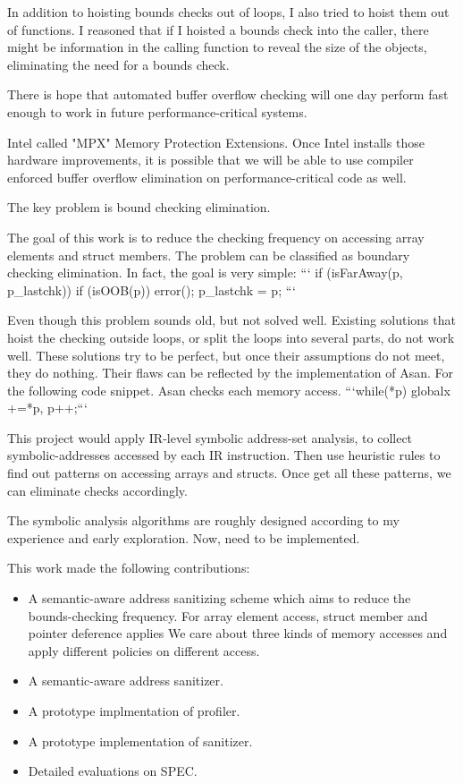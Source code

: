 



In addition to hoisting bounds checks out of loops, I also tried to hoist them out of functions. I reasoned that if I hoisted a bounds check into the caller, there might be information in the calling function to reveal the size of the objects, eliminating the need for a bounds check.


There is hope that automated buffer overflow checking will one day perform fast enough to work in future performance-critical systems.


Intel called "MPX" Memory Protection Extensions. Once Intel installs those hardware improvements, it is possible that we will be able to use compiler enforced buffer overflow elimination on performance-critical code as well.

The key problem is bound checking elimination.


The goal of this work is to reduce the checking frequency on accessing array elements and struct members.
The problem can be classified as boundary checking elimination. In fact, the goal is very simple:
```
if (isFarAway(p, p_lastchk)) {
    if (isOOB(p)) error();
    p_lastchk = p;
  }
```

Even though this problem sounds old, but not solved well.
Existing solutions that hoist the checking outside loops, or split the loops into several parts, do not work well.
These solutions try to be perfect, but once their assumptions do not meet, they do nothing.
Their flaws can be reflected by the implementation of Asan.
For the following code snippet. Asan checks each memory access.
```while(*p) {globalx +=*p, p++;}```

This project would apply IR-level symbolic address-set analysis, to collect symbolic-addresses accessed by each IR instruction.
Then use heuristic rules to find out patterns on accessing arrays and structs.
Once get all these patterns, we can eliminate checks accordingly.

The symbolic analysis algorithms are roughly designed according to my experience and early exploration.
Now, need to be implemented.


This work made the following contributions:

\begin{itemize}
  \item A semantic-aware address sanitizing scheme which aims to reduce the bounds-checking frequency.  For array element access, struct member and pointer deference applies We care about three kinds of memory accesses and apply different policies on different access.
  \item A semantic-aware address sanitizer.
  \item A prototype implmentation of profiler.
  \item A prototype implementation of sanitizer.
  \item Detailed evaluations on SPEC.
\end{itemize}

